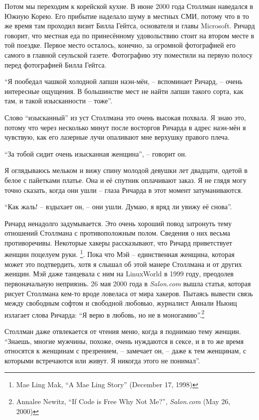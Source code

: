Потом мы переходим к корейской кухне. В июне 2000 года Столлман наведался в Южную Корею. Его прибытие наделало шуму в местных СМИ, потому что в то же время там проходил визит Билла Гейтса, основателя и главы Microsoft. Ричард говорит, что местная еда по принесённому удовольствию стоит на втором месте в той поездке. Первое место осталось, конечно, за огромной фотографией его самого в главной сеульской газете. Фотографию эту поместили на первую полосу перед фотографией Билла Гейтса.

\enquote{Я пообедал чашкой холодной лапши наэн-мён, -- вспоминает Ричард, -- очень интересные ощущения. В большинстве мест не найти лапши такого сорта, как там, и такой изысканности -- тоже}.

Слово \enquote{изысканный} из уст Столлмана это очень высокая похвала. Я знаю это, потому что через несколько минут после восторгов Ричарда в адрес наэн-мён я чувствую, как его лазерные лучи опаливают мне верхушку правого плеча.

\enquote{За тобой сидит очень изысканная женщина}, -- говорит он.

Я оглядываюсь мельком и вижу спину молодой девушки лет двадцати, одетой в белое с пайетками платье. Она и её спутник оплачивают заказ. Я не глядя могу точно сказать, когда они ушли -- глаза Ричарда в этот момент затуманиваются.

\enquote{Как жаль! -- вздыхает он, -- они ушли. Думаю, я вряд ли увижу её снова}.

Ричард ненадолго задумывается. Это очень хороший повод затронуть тему отношений Столлмана с противоположным полом. Сведения о них весьма противоречивы. Некоторые хакеры рассказывают, что Ричард приветствует женщин поцелуем руки. \footnote{Mae Ling Mak, \enquote{A Mae Ling Story} (December 17, 1998)}. Пока что Мэй -- единственная женщина, которая может это подтвердить, хотя я слышал об этой манере Столлмана и от других женщин. Мэй даже танцевала с ним на LinuxWorld в 1999 году, преодолев первоначальную неприязнь. 26 мая 2000 года в \textit{Salon.com} вышла статья, которая рисует Столлмана кем-то вроде ловеласа от мира хакеров. Пытаясь вывести связь между свободным софтом и свободной любовью, журналист Аннали Ньюиц излагает слова Ричарда: \enquote{Я верю в любовь, но не в моногамию}.\footnote{Annalee Newitz, \enquote{If Code is Free Why Not Me?}, \textit{Salon.com} (May 26, 2000)}

Столлман даже отвлекается от чтения меню, когда я поднимаю тему женщин. \enquote{Знаешь, многие мужчины, похоже, очень нуждаются в сексе, и в то же время относятся к женщинам с презрением, -- замечает он, -- даже к тем женщинам, с которыми встречаются или живут. Я никогда этого не понимал}.

